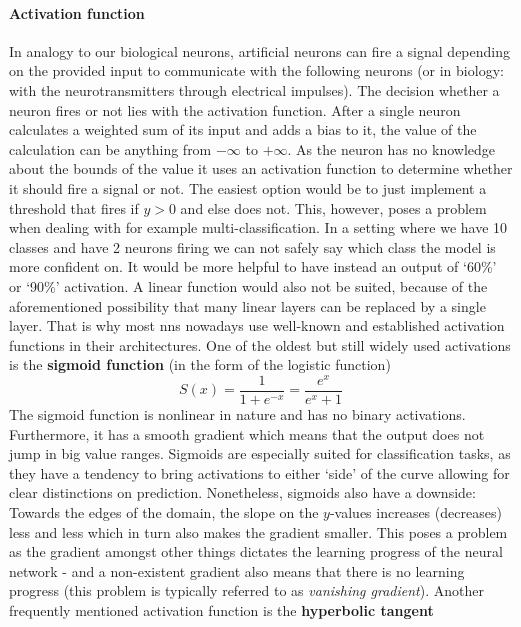 \paragraph{Activation function}\label{par:activation_function}
In analogy to our biological neurons, artificial neurons can fire a signal depending on the provided input to communicate with the following neurons (or in biology: with the neurotransmitters through electrical impulses). The decision whether a neuron fires or not lies with the activation function. After a single neuron calculates a weighted sum of its input and adds a bias to it, the value of the calculation can be anything from $ -\infty $ to $ +\infty $. As the neuron has no knowledge about the bounds of the value it uses an activation function to determine whether it should fire a signal or not.
The easiest option would be to just implement a threshold that fires if $ y > 0 $ and else does not. This, however, poses a problem when dealing with for example multi-classification. In a setting where we have 10 classes and have 2 neurons firing we can not safely say which class the model is more confident on. It would be more helpful to have instead an output of `60\%' or `90\%' activation. A linear function would also not be suited, because of the aforementioned possibility that many linear layers can be replaced by a single layer. That is why most \gls{nn}s nowadays use well-known and established activation functions in their architectures. One of the oldest but still widely used activations is the \textbf{sigmoid function} (in the form of the logistic function)
\begin{equation}
	S(x) = \frac{1}{1+e^{-x}} = \frac {e^{x}}{e^{x}+1}
\end{equation}
The sigmoid function is nonlinear in nature and has no binary activations. Furthermore, it has a smooth gradient which means that the output does not jump in big value ranges. Sigmoids are especially suited for classification tasks, as they have a tendency to bring activations to either `side' of the curve allowing for clear distinctions on prediction. Nonetheless, sigmoids also have a downside: Towards the edges of the domain, the slope on the $ y $-values increases (decreases) less and less which in turn also makes the gradient smaller. This poses a problem as the gradient amongst other things dictates the learning progress of the neural network - and a non-existent gradient also means that there is no learning progress (this problem is typically referred to as \textit{vanishing gradient}). Another frequently mentioned activation function is the \textbf{hyperbolic tangent}
